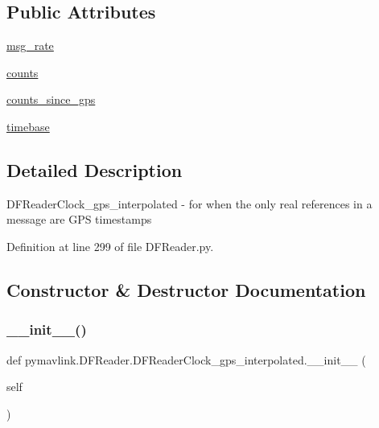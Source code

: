 \subsection*{Public Attributes}
\begin{DoxyCompactItemize}
\item 
\mbox{\hyperlink{classpymavlink_1_1DFReader_1_1DFReaderClock__gps__interpolated_aa7bdd91fcd1dd2ee9d701caf77c4978a}{msg\+\_\+rate}}
\item 
\mbox{\hyperlink{classpymavlink_1_1DFReader_1_1DFReaderClock__gps__interpolated_a586f972d49a5d5354e4b97bc7c6e7f2e}{counts}}
\item 
\mbox{\hyperlink{classpymavlink_1_1DFReader_1_1DFReaderClock__gps__interpolated_aa7fab5e1d8cccb71faff42cdce961eed}{counts\+\_\+since\+\_\+gps}}
\item 
\mbox{\hyperlink{classpymavlink_1_1DFReader_1_1DFReaderClock__gps__interpolated_a54664e7bb953dde5958fe487b95f6d5f}{timebase}}
\end{DoxyCompactItemize}


\subsection{Detailed Description}
\begin{DoxyVerb}DFReaderClock_gps_interpolated - for when the only real references
in a message are GPS timestamps\end{DoxyVerb}
 

Definition at line 299 of file D\+F\+Reader.\+py.



\subsection{Constructor \& Destructor Documentation}
\mbox{\label{classpymavlink_1_1DFReader_1_1DFReaderClock__gps__interpolated_a3f055fcf15691808e52dec36a04d2efd}} 
\subsubsection{\texorpdfstring{\_\_init\_\_()}{\_\_init\_\_()}}
{\footnotesize\ttfamily def pymavlink.\+D\+F\+Reader.\+D\+F\+Reader\+Clock\+\_\+gps\+\_\+interpolated.\+\_\+\+\_\+init\+\_\+\+\_\+ (\begin{DoxyParamCaption}\item[{}]{self }\end{DoxyParamCaption})}



